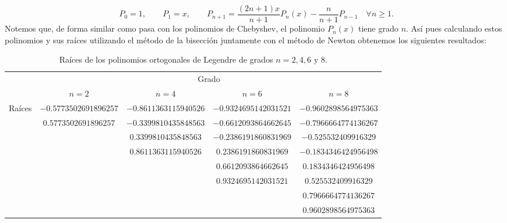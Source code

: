 \documentclass[a4paper]{article}
\begin{document}
$$P_0=1,\qquad P_1=x,\qquad P_{n+1}=\frac{(2n+1)x}{n+1}P_n(x)-\frac{n}{n+1}P_{n-1}\quad\forall n\geq 1.$$ Notemos que, de forma similar como pasa con los polinomios de Chebyshev, el polinomio $P_n(x)$ tiene grado $n$. Así pues calculando estos polinomios y sus raíces utilizando el método de la bisección juntamente con el método de Newton obtenemos los siguientes resultados:
\begin{table}[ht]
    \centering
    \begin{tabular}{|c|c|c|c|c|}
        \cline{2-5}
        \multicolumn{1}{c|}{} & \multicolumn{4}{c|}{Grado}\\
        \cline{2-5}
        \multicolumn{1}{c|}{} & $n=2$ & $n=4$ & $n=6$ & $n=8$ \\
        \hline
        \multirow{8}{*}{Raíces} & $-0.5773502691896257$ & $-0.8611363115940526$ & $-0.9324695142031521$ & $-0.9602898564975363$ \\
        & $0.5773502691896257$ & $-0.3399810435848563$ & $-0.6612093864662645$ & $-0.7966664774136267$ \\
        & & $0.3399810435848563$ & $-0.2386191860831969$ & $-0.525532409916329$ \\
        & & $0.8611363115940526$ & $0.2386191860831969$ & $-0.1834346424956498$ \\
        & & & $0.6612093864662645$ & $0.1834346424956498$ \\
        & & & $0.9324695142031521$ & $0.525532409916329$ \\
        & & & & $0.7966664774136267$ \\
        & & & & $0.9602898564975363$ \\
        \hline
    \end{tabular}
    \caption{Raíces de los polinomios ortogonales de Legendre de grados $n=2,4,6\text{ y }8$.}
\end{table}
\end{document}
